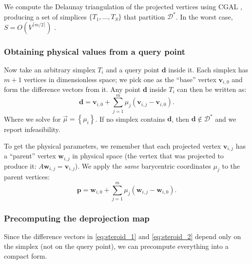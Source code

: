 \documentclass[review,onefignum,onetabnum]{./SIAM_template/siamart171218}
\begin{document}
We compute the Delaunay triangulation of the projected vertices using
CGAL \cite{cgal}, producing a set of simplices $\{T_1, \ldots, T_S\}$ that
partition $\mathcal{D}^*$.  In the worst case,
$S = O(V^{\lceil m/2 \rceil})$ \cite{McMullen1970}.

\subsubsection{Obtaining physical values from a query point}

Now take an arbitrary simplex $T_i$ and a query point $\mathbf{d}$ inside it.
Each simplex has $m+1$ vertices in dimensionless space; we pick one as the
``base'' vertex $\mathbf{v}_{i,0}$ and form the difference vectors from it.
Any point $\mathbf{d}$ inside $T_i$ can then be written as:
\begin{equation}
	\label{eq:steroid_1}
	\mathbf{d} = \mathbf{v}_{i,0} + \sum_{j=1}^{m} \mu_j
	(\mathbf{v}_{i,j} - \mathbf{v}_{i,0}).
\end{equation}
Where we solve for $\vec{\mu} = \left\{ \mu_i \right\}$.
If no simplex contains $\mathbf{d}$, then
$\mathbf{d} \notin \mathcal{D}^*$ and we report infeasibility.

To get the physical parameters, we remember that each projected vertex
$\mathbf{v}_{i,j}$ has a ``parent'' vertex $\mathbf{w}_{i,j}$ in physical space
(the vertex that was projected to produce it: $A\mathbf{w}_{i,j} = \mathbf{v}_{i,j}$).
We apply the \emph{same} barycentric coordinates $\mu_j$ to the parent vertices:
\begin{equation}
	\label{eq:steroid_2}
	\mathbf{p} = \mathbf{w}_{i,0} + \sum_{j=1}^{m} \mu_j
	(\mathbf{w}_{i,j} - \mathbf{w}_{i,0}).
\end{equation}

\subsubsection{Precomputing the deprojection map}

Since the difference vectors in \eqref{eq:steroid_1} and \eqref{eq:steroid_2}
depend only on the simplex (not on the query point), we can precompute
everything into a compact form.
\end{document}
